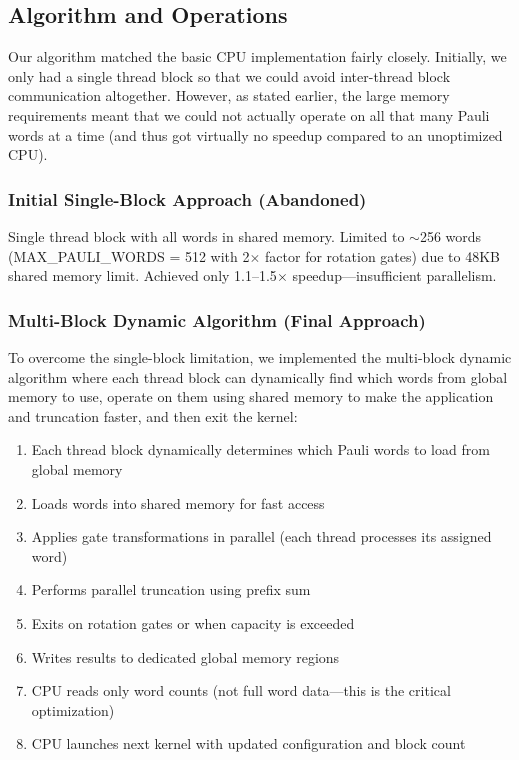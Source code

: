 \documentclass[11pt, a4paper]{article}
\begin{document}
\subsection{Algorithm and Operations}

Our algorithm matched the basic CPU implementation fairly closely. Initially, we only had a single thread block so that we could avoid inter-thread block communication altogether. However, as stated earlier, the large memory requirements meant that we could not actually operate on all that many Pauli words at a time (and thus got virtually no speedup compared to an unoptimized CPU).

\subsubsection{Initial Single-Block Approach (Abandoned)}

Single thread block with all words in shared memory. Limited to $\sim$256 words (MAX\_PAULI\_WORDS = 512 with 2$\times$ factor for rotation gates) due to 48KB shared memory limit. Achieved only 1.1--1.5$\times$ speedup---insufficient parallelism.

\subsubsection{Multi-Block Dynamic Algorithm (Final Approach)}

To overcome the single-block limitation, we implemented the multi-block dynamic algorithm where each thread block can dynamically find which words from global memory to use, operate on them using shared memory to make the application and truncation faster, and then exit the kernel:

\begin{enumerate}
    \item Each thread block dynamically determines which Pauli words to load from global memory
    \item Loads words into shared memory for fast access
    \item Applies gate transformations in parallel (each thread processes its assigned word)
    \item Performs parallel truncation using prefix sum
    \item Exits on rotation gates or when capacity is exceeded
    \item Writes results to dedicated global memory regions
    \item CPU reads only word counts (not full word data---this is the critical optimization)
    \item CPU launches next kernel with updated configuration and block count
\end{enumerate}
\end{document}
